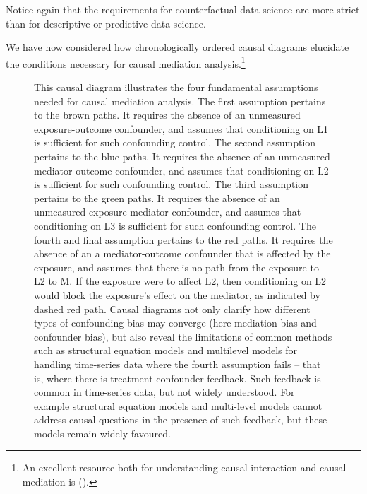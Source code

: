 \documentclass[
  singlecolumn]{article}
\begin{document}
Notice again that the requirements for counterfactual data science are
more strict than for descriptive or predictive data science.

We have now considered how chronologically ordered causal diagrams
elucidate the conditions necessary for causal mediation
analysis.\footnote{An excellent resource both for understanding causal
  interaction and causal mediation is
  ().}

\begin{figure}


\caption{\label{fig-dag-mediation-assumptions}This causal diagram
illustrates the four fundamental assumptions needed for causal mediation
analysis. The first assumption pertains to the brown paths. It requires
the absence of an unmeasured exposure-outcome confounder, and assumes
that conditioning on L1 is sufficient for such confounding control. The
second assumption pertains to the blue paths. It requires the absence of
an unmeasured mediator-outcome confounder, and assumes that conditioning
on L2 is sufficient for such confounding control. The third assumption
pertains to the green paths. It requires the absence of an unmeasured
exposure-mediator confounder, and assumes that conditioning on L3 is
sufficient for such confounding control. The fourth and final assumption
pertains to the red paths. It requires the absence of an a
mediator-outcome confounder that is affected by the exposure, and
assumes that there is no path from the exposure to L2 to M. If the
exposure were to affect L2, then conditioning on L2 would block the
exposure's effect on the mediator, as indicated by dashed red path.
Causal diagrams not only clarify how different types of confounding bias
may converge (here mediation bias and confounder bias), but also reveal
the limitations of common methods such as structural equation models and
multilevel models for handling time-series data where the fourth
assumption fails -- that is, where there is treatment-confounder
feedback. Such feedback is common in time-series data, but not widely
understood. For example structural equation models and multi-level
models cannot address causal questions in the presence of such feedback,
but these models remain widely favoured.}

\end{figure}%
\end{document}
